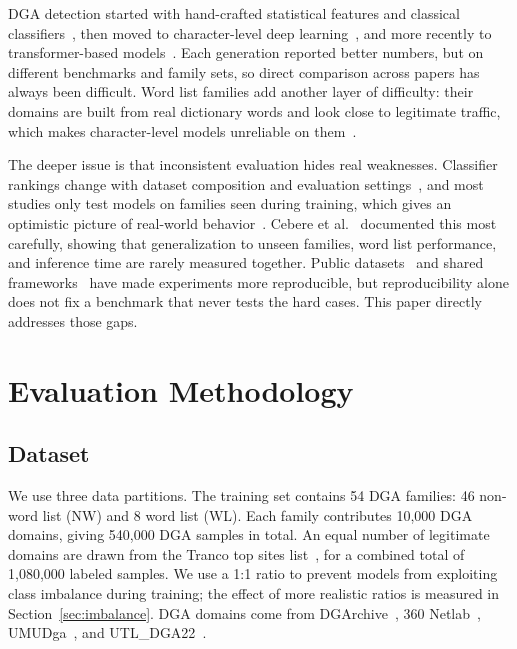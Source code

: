 \documentclass[conference]{IEEEtran}
\begin{document}
DGA detection started with hand-crafted statistical features and classical classifiers~\cite{yadav2010detecting, schuppen2018fanci, vranken2022tfidf}, then moved to character-level deep learning~\cite{catania2019analysis, woodbridge2016predicting, tuan2022detecting, yu2018character}, and more recently to transformer-based models~\cite{mahdaouy2024domurls_bert, la2024llms, alqahtani2025llmreview}. Each generation reported better numbers, but on different benchmarks and family sets, so direct comparison across papers has always been difficult. Word list families add another layer of difficulty: their domains are built from real dictionary words and look close to legitimate traffic, which makes character-level models unreliable on them~\cite{highnam2021realtime, satoh2021word}.

The deeper issue is that inconsistent evaluation hides real weaknesses. Classifier rankings change with dataset composition and evaluation settings~\cite{sivaguru2019evaluation, zago2020scalable}, and most studies only test models on families seen during training, which gives an optimistic picture of real-world behavior~\cite{lu2025transformer, duc2025federated}. Cebere et al.~\cite{cebere2024down} documented this most carefully, showing that generalization to unseen families, word list performance, and inference time are rarely measured together. Public datasets~\cite{zago2020umudga, tuan2023utldga22} and shared frameworks~\cite{pelayo2025rampage} have made experiments more reproducible, but reproducibility alone does not fix a benchmark that never tests the hard cases. This paper directly addresses those gaps.

\section{Evaluation Methodology}
\label{sec:design}

\subsection{Dataset}

We use three data partitions. The training set contains 54 DGA families: 46 non-word list (NW) and 8 word list (WL). Each family contributes 10,000 DGA     
  domains, giving 540,000 DGA samples in total. An equal number of legitimate domains are drawn from the Tranco top sites list~\cite{tranco}, for a combined  
  total of 1,080,000 labeled samples. We use a 1:1 ratio to prevent models from exploiting class imbalance during training; the effect of more realistic      
  ratios is measured in Section~\ref{sec:imbalance}. DGA domains come from DGArchive~\cite{plohmann2015dgaarchive}, 360 Netlab~\cite{360netlab},              
  UMUDga~\cite{zago2020umudga}, and UTL\_DGA22~\cite{tuan2023utldga22}.                                                                                        
                                                                                                                                                              
\end{document}
